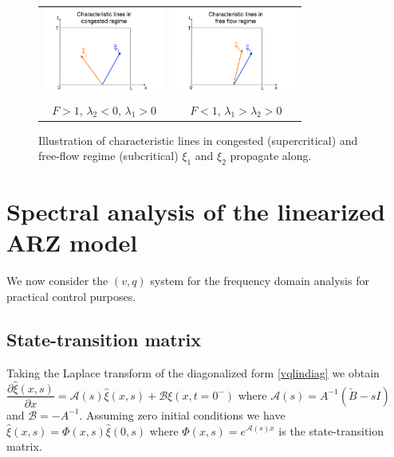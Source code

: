 \documentclass[a4paper, 10pt, conference]{ieeeconf}      %
\begin{document}
\begin{figure}
\begin{centering}
\begin{tabular}{cc}
\includegraphics[width=4cm]{Congested-regime} & \includegraphics[width=4cm]{Free-flow-regime}\tabularnewline
$F>1$, $\lambda_{2}<0$, $\lambda_{1}>0$ & $F<1$, $\lambda_{1}>\lambda_{2}>0$\tabularnewline
\end{tabular}
\par\end{centering}
\protect\caption{Illustration of characteristic lines in congested (supercritical) and free-flow regime (subcritical) $\xi_1$ and $\xi_2$ propagate along.\label{Characteristics}}
\end{figure}


\section{Spectral analysis of the linearized ARZ model}
We now consider the $(v,q)$ system for the frequency domain analysis for practical control purposes.

\subsection{State-transition matrix}
Taking the Laplace transform of the diagonalized form \eqref{vqlindiag} we obtain 
{\footnotesize
$\dfrac{\partial \hat{\xi} (x,s)}{\partial x} = \mathscr{A}(s)\hat{\xi}(x,s) + \mathscr{B}\xi(x,t=0^-)$
}
where {\footnotesize$\mathscr{A}(s) = A^{-1}(\tilde{B} - sI)$} and {\footnotesize $\mathscr{B} = -A^{-1}$}. Assuming zero initial conditions we have 
{\footnotesize \label{TFRiemann}
$\hat{\xi}(x,s) = \Phi(x,s)\hat{\xi}(0,s)$
}
where {\footnotesize$\Phi(x,s) = e^{\mathscr{A}(s)x}$} is the state-transition matrix.
\end{document}
